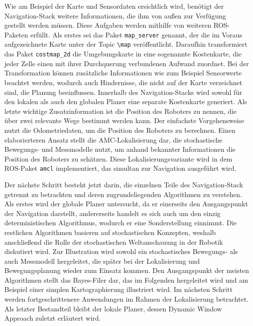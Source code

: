 Wie am Beispiel der Karte und Sensordaten ersichtlich wird, benötigt der Navigation-Stack weitere Informationen, die ihm von außen zur Verfügung gestellt werden müssen. Diese Aufgaben werden mithilfe von weiteren ROS-Paketen erfüllt. Als erstes sei das Paket \lstinline{map_server}{} genannt, der die im Voraus aufgezeichnete Karte unter der Topic \lstinline{\map}{} veröffentlicht. Daraufhin transformiert das Paket \lstinline{costmap_2d}{} die Umgebungskarte in eine sogenannte Kostenkarte, die jeder Zelle einen mit ihrer Durchquerung verbundenen Aufwand zuordnet. Bei der Transformation können zusätzliche Informationen wie zum Beispiel Sensorwerte beachtet werden, wodurch auch Hindernisse, die nicht auf der Karte verzeichnet sind, die Planung beeinflussen. Innerhalb des Navigation-Stacks wird sowohl für den lokalen als auch den globalen Planer eine separate Kostenkarte generiert.
Als letzte wichtige Zusatzinformation ist die Position des Roboters zu nennen, die über zwei relevante Wege bestimmt werden kann. Der einfachste Vorgehensweise nutzt die Odometriedaten, um die Position des Roboters zu berechnen. Einen elaborierteren Ansatz stellt die AMC-Lokalisierung dar, die stochastische Bewegungs- und Messmodelle nutzt, um anhand bekannter Informationen die Position des Roboters zu schätzen. Diese Lokalisierungsvariante wird in dem ROS-Paket \lstinline{amcl}{} implementiert, das simultan zur Navigation ausgeführt wird.

Der nächste Schritt besteht jetzt darin, die einzelnen Teile des Navigation-Stack getrennt zu betrachten und deren zugrundeliegenden Algorithmen zu verstehen. Als erstes wird der globale Planer untersucht, da er einerseits den Ausgangspunkt der Navigation darstellt, andererseits handelt es sich auch um den einzig deterministischen Algorithmus, wodurch er eine Sonderstellung einnimmt. Die restlichen Algorithmen basieren auf stochastischen Konzepten, weshalb anschließend die Rolle der stochastischen Weltanschauung in der Robotik diskutiert wird. Zur Illustration wird sowohl ein stochastisches Bewegungs- als auch Messmodell hergeleitet, die später bei der Lokalisierung und Bewegungsplanung wieder zum Einsatz kommen. Den Ausgangspunkt der meisten Algorithmen stellt das Bayes-Filer dar, das im Folgenden hergeleitet wird und am Beispiel einer simplen Kartographierung illustriert wird. Im nächsten Schritt werden fortgeschrittenere Anwendungen im Rahmen der Lokalisierung betrachtet. Als letzter Bestandteil bleibt der lokale Planer, dessen Dynamic Window Approach zuletzt erläutert wird.